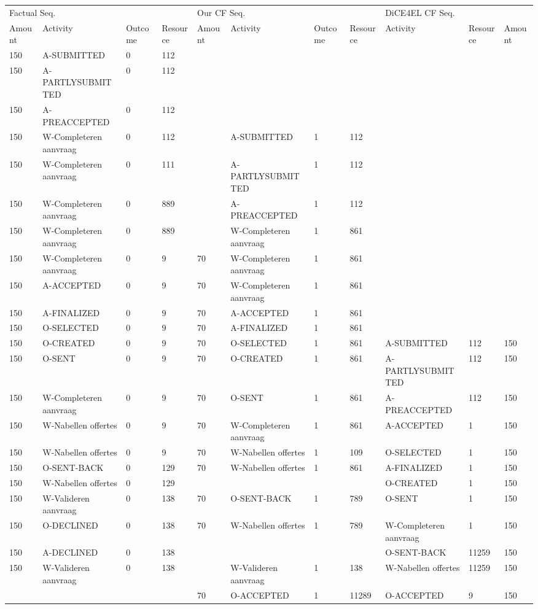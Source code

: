 \begin{tabular}{lllllllllll}
\toprule
\multicolumn{4}{l}{Factual Seq.} & \multicolumn{4}{l}{Our CF Seq.} & \multicolumn{3}{l}{DiCE4EL CF Seq.} \\
Amount & Activity & Outcome & Resource & Amount & Activity & Outcome & Resource & Activity & Resource & Amount \\
\midrule
150 & A-SUBMITTED & 0 & 112 &  &  &  &  &  &  &  \\
150 & A-PARTLYSUBMITTED & 0 & 112 &  &  &  &  &  &  &  \\
150 & A-PREACCEPTED & 0 & 112 &  &  &  &  &  &  &  \\
150 & W-Completeren aanvraag & 0 & 112 &  & A-SUBMITTED & 1 & 112 &  &  &  \\
150 & W-Completeren aanvraag & 0 & 111 &  & A-PARTLYSUBMITTED & 1 & 112 &  &  &  \\
150 & W-Completeren aanvraag & 0 & 889 &  & A-PREACCEPTED & 1 & 112 &  &  &  \\
150 & W-Completeren aanvraag & 0 & 889 &  & W-Completeren aanvraag & 1 & 861 &  &  &  \\
150 & W-Completeren aanvraag & 0 & 9 & 70 & W-Completeren aanvraag & 1 & 861 &  &  &  \\
150 & A-ACCEPTED & 0 & 9 & 70 & W-Completeren aanvraag & 1 & 861 &  &  &  \\
150 & A-FINALIZED & 0 & 9 & 70 & A-ACCEPTED & 1 & 861 &  &  &  \\
150 & O-SELECTED & 0 & 9 & 70 & A-FINALIZED & 1 & 861 &  &  &  \\
150 & O-CREATED & 0 & 9 & 70 & O-SELECTED & 1 & 861 & A-SUBMITTED & 112 & 150 \\
150 & O-SENT & 0 & 9 & 70 & O-CREATED & 1 & 861 & A-PARTLYSUBMITTED & 112 & 150 \\
150 & W-Completeren aanvraag & 0 & 9 & 70 & O-SENT & 1 & 861 & A-PREACCEPTED & 112 & 150 \\
150 & W-Nabellen offertes & 0 & 9 & 70 & W-Completeren aanvraag & 1 & 861 & A-ACCEPTED & 1 & 150 \\
150 & W-Nabellen offertes & 0 & 9 & 70 & W-Nabellen offertes & 1 & 109 & O-SELECTED & 1 & 150 \\
150 & O-SENT-BACK & 0 & 129 & 70 & W-Nabellen offertes & 1 & 861 & A-FINALIZED & 1 & 150 \\
150 & W-Nabellen offertes & 0 & 129 &  &  &  &  & O-CREATED & 1 & 150 \\
150 & W-Valideren aanvraag & 0 & 138 & 70 & O-SENT-BACK & 1 & 789 & O-SENT & 1 & 150 \\
150 & O-DECLINED & 0 & 138 & 70 & W-Nabellen offertes & 1 & 789 & W-Completeren aanvraag & 1 & 150 \\
150 & A-DECLINED & 0 & 138 &  &  &  &  & O-SENT-BACK & 11259 & 150 \\
150 & W-Valideren aanvraag & 0 & 138 &  & W-Valideren aanvraag & 1 & 138 & W-Nabellen offertes & 11259 & 150 \\
 &  &  &  & 70 & O-ACCEPTED & 1 & 11289 & O-ACCEPTED & 9 & 150 \\
\bottomrule
\end{tabular}
